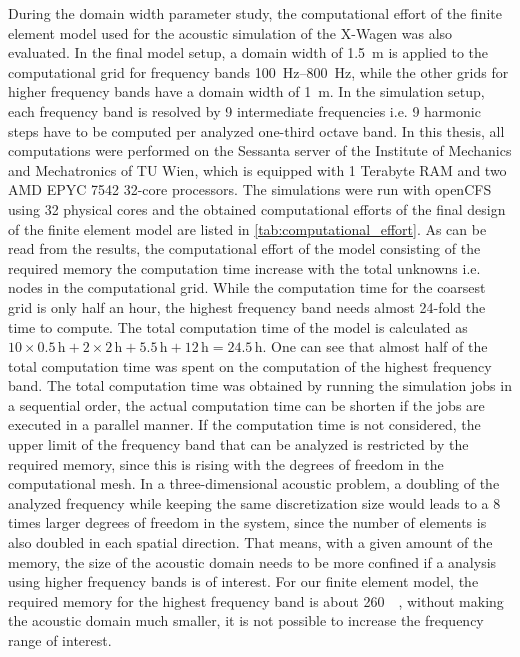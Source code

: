 During the domain width parameter study, the computational effort of the finite element model used for the acoustic simulation of the X-Wagen was also evaluated. In the final model setup, a domain width of \SI{1.5}{\meter} is applied to the computational grid for frequency bands \SIrange{100}{800}{\hertz}, while the other grids for higher frequency bands have a domain width of \SI{1}{\meter}. In the simulation setup, each frequency band is resolved by 9 intermediate frequencies i.e. 9 harmonic steps have to be computed per analyzed one-third octave band. In this thesis, all computations were performed on the Sessanta server of the Institute of Mechanics and Mechatronics of TU Wien, which is equipped with 1 Terabyte RAM and two AMD EPYC 7542 32-core processors. The simulations were run with openCFS using 32 physical cores and the obtained computational efforts of the final design of the finite element model are listed in \cref{tab:computational_effort}. As can be read from the results, the computational effort of the model consisting of the required memory the computation time increase with the total unknowns i.e. nodes in the computational grid. While the computation time for the coarsest grid is only half an hour, the highest frequency band needs almost 24-fold the time to compute. The total computation time of the model is calculated as $10\times 0.5\,\text{h} + 2\times 2\,\text{h} + 5.5\,\text{h} + 12\,\text{h} = 24.5\,\text{h}$. One can see that almost half of the total computation time was spent on the computation of the highest frequency band. The total computation time was obtained by running the simulation jobs in a sequential order, the actual computation time can be shorten if the jobs are executed in a parallel manner. If the computation time is not considered, the upper limit of the frequency band that can be analyzed is restricted by the required memory, since this is rising with the degrees of freedom in the computational mesh. In a three-dimensional acoustic problem, a doubling of the analyzed frequency while keeping the same discretization size would leads to a 8 times larger degrees of freedom in the system, since the number of elements is also doubled in each spatial direction. That means, with a given amount of the memory, the size of the acoustic domain needs to be more confined if a analysis using higher frequency bands is of interest. For our finite element model, the required memory for the highest frequency band is about \SI{260}{\giga\byte}, without making the acoustic domain much smaller, it is not possible to increase the frequency range of interest.

